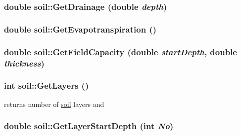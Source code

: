 \label{classsoil_a4b5fc63de9d8e884671531a728275a88}
\hypertarget{classsoil_ab114def0736881d1d3ff39454ff70e67}{
\subsubsection[{GetDrainage}]{\setlength{\rightskip}{0pt plus 5cm}double soil::GetDrainage (double {\em depth})}}
\label{classsoil_ab114def0736881d1d3ff39454ff70e67}
\hypertarget{classsoil_a126d3562bbb76b6055c141d2227ddde7}{
\subsubsection[{GetEvapotranspiration}]{\setlength{\rightskip}{0pt plus 5cm}double soil::GetEvapotranspiration ()}}
\label{classsoil_a126d3562bbb76b6055c141d2227ddde7}
\hypertarget{classsoil_a7393e26e3493fc1af1304fc59f3a73d0}{
\subsubsection[{GetFieldCapacity}]{\setlength{\rightskip}{0pt plus 5cm}double soil::GetFieldCapacity (double {\em startDepth}, \/  double {\em thickness})}}
\label{classsoil_a7393e26e3493fc1af1304fc59f3a73d0}
\hypertarget{classsoil_a815f1ebcaf7c7fa7a11c91ebf6edf800}{
\subsubsection[{GetLayers}]{\setlength{\rightskip}{0pt plus 5cm}int soil::GetLayers ()}}
\label{classsoil_a815f1ebcaf7c7fa7a11c91ebf6edf800}


returns number of \hyperlink{classsoil}{soil} layers and \hypertarget{classsoil_acd6c1b86da5c93a694b15d52cfb26a51}{
\subsubsection[{GetLayerStartDepth}]{\setlength{\rightskip}{0pt plus 5cm}double soil::GetLayerStartDepth (int {\em No})}}
\label{classsoil_acd6c1b86da5c93a694b15d52cfb26a51}


